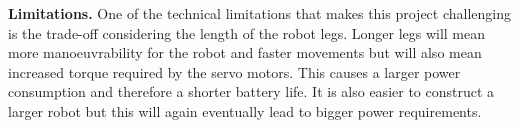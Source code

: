 \textbf{Limitations.}
One of the technical limitations that makes this project challenging is the trade-off considering the length of the robot legs. Longer legs will mean more manoeuvrability for the robot and faster movements but will also mean increased torque required by the servo motors. This causes a larger power consumption and therefore a shorter battery life. It is also easier to construct a larger robot but this will again eventually lead to bigger power requirements.



